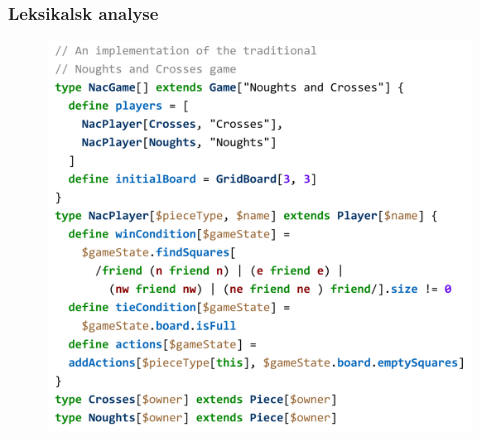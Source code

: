 \begin{frame}
  \frametitle{Leksikalsk analyse}

  \begin{figure}
    \includegraphics[width=0.6\linewidth]{billeder/krydsogbolle}
  \end{figure}
\end{frame}

